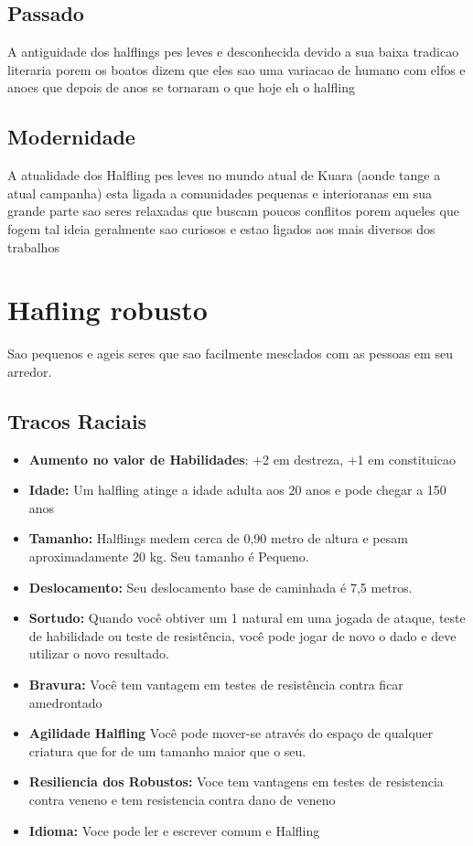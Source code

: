 \documentclass{book}
\begin{document}
\section{Passado}
A antiguidade dos halflings pes leves e desconhecida devido a sua baixa tradicao literaria 
porem os boatos dizem que eles sao uma variacao de humano com elfos e anoes que depois de
anos se tornaram o que hoje eh o halfling
\section{Modernidade}
A atualidade dos Halfling pes leves no mundo atual de Kuara (aonde tange a atual campanha) 
esta ligada a comunidades pequenas e interioranas
em sua grande parte sao seres relaxadas que buscam poucos conflitos porem aqueles que 
fogem tal ideia geralmente sao curiosos e estao ligados aos mais diversos dos trabalhos

\chapter{Hafling robusto}
    Sao pequenos e ageis seres que sao facilmente mesclados com as pessoas em seu arredor.
\section{Tracos Raciais}
\begin{itemize}
    \item \textbf{Aumento no valor de Habilidades}: +2 em destreza, +1 em constituicao
    \item \textbf{Idade:} Um halfling atinge a idade adulta aos 20 anos e pode chegar a 150    
          anos
    \item \textbf{Tamanho:} Halflings medem cerca de 0,90 metro de altura e pesam 
          aproximadamente 20 kg. Seu tamanho é Pequeno.
    \item \textbf{Deslocamento:} Seu deslocamento base de caminhada é 7,5 metros.
    \item \textbf{Sortudo:} Quando você obtiver um 1 natural em uma jogada de ataque, teste 
          de habilidade ou teste de resistência, você pode jogar de novo o dado e deve 
          utilizar o novo resultado.
    \item \textbf{Bravura:} Você tem vantagem em testes de resistência contra ficar amedrontado
    \item \textbf{Agilidade Halfling} Você pode mover-se através do espaço de qualquer 
          criatura que for de um tamanho maior que o seu.
    \item \textbf{Resiliencia dos Robustos: }Voce tem vantagens em testes de resistencia 
          contra veneno e tem resistencia contra dano de veneno
    \item \textbf{Idioma:} Voce pode ler e escrever comum e Halfling

\end{itemize}
\end{document}
